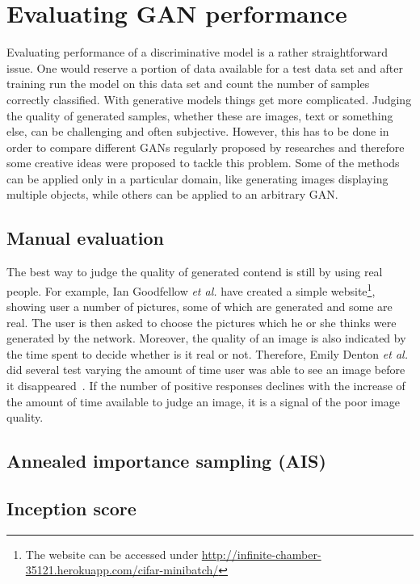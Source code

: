\section{Evaluating GAN performance}
Evaluating performance of a discriminative model is a rather straightforward issue. One would reserve a portion of data available for a test data set and after training run the model on this data set and count the number of samples correctly classified. With generative models things get more complicated. Judging the quality of generated samples, whether these are images, text or something else, can be challenging and often subjective. However, this has to be done in order to compare different GANs regularly proposed by researches and therefore some creative ideas were proposed to tackle this problem. Some of the methods can be applied only in a particular domain, like generating images displaying multiple objects, while others can be applied to an arbitrary GAN. 
\subsection{Manual evaluation}
The best way to judge the quality of generated contend is still by using real people. For example, Ian Goodfellow \textit{et al.} have created a simple website\footnote{The website can be accessed under  \url{http://infinite-chamber-35121.herokuapp.com/cifar-minibatch/}}, showing user a number of pictures, some of which are generated and some are real. The user is then asked to choose the pictures which he or she thinks were generated by the network. Moreover, the quality of an image is also indicated by the time spent to decide whether is it real or not. Therefore, Emily Denton \textit{et al.} did several test varying the amount of time user was able to see an image before it disappeared~\cite{laplacian_gan}. If the number of positive responses declines with the increase of the amount of time available to judge an image, it is a signal of the poor image quality.
\subsection{Annealed importance sampling (AIS)}
\subsection{Inception score}

